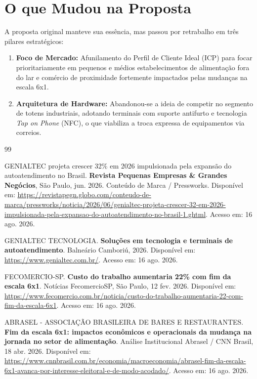 \documentclass[a4paper]{article}
\begin{document}
\section{O que Mudou na Proposta}

A proposta original manteve sua essência, mas passou por retrabalho em três pilares estratégicos:
\begin{enumerate}
    \item \textbf{Foco de Mercado:} Afunilamento do Perfil de Cliente Ideal (ICP) para focar prioritariamente em pequenos e médios estabelecimentos de alimentação fora do lar e comércio de proximidade fortemente impactados pelas mudanças na escala 6x1.
    \item \textbf{Arquitetura de Hardware:} Abandonou-se a ideia de competir no segmento de totens industriais, adotando terminais com suporte antifurto e tecnologia \textit{Tap on Phone} (NFC), o que viabiliza a troca expressa de equipamentos via correios.
\end{enumerate}

\begin{thebibliography}{99}

GENIALTEC projeta crescer 32\% em 2026 impulsionada pela expansão do autoatendimento no Brasil. \textbf{Revista Pequenas Empresas \& Grandes Negócios}, São Paulo, jun. 2026. Conteúdo de Marca / Pressworks. Disponível em: \url{https://revistapegn.globo.com/conteudo-de-marca/pressworks/noticia/2026/06/genialtec-projeta-crescer-32-em-2026-impulsionada-pela-expansao-do-autoatendimento-no-brasil-1.ghtml}. Acesso em: 16 ago. 2026.

GENIALTEC TECNOLOGIA. \textbf{Soluções em tecnologia e terminais de autoatendimento}. Balneário Camboriú, 2026. Disponível em: \url{https://www.genialtec.com.br/}. Acesso em: 16 ago. 2026.

FECOMERCIO-SP. \textbf{Custo do trabalho aumentaria 22\% com fim da escala 6x1}. Notícias FecomercioSP, São Paulo, 12 fev. 2026. Disponível em: \url{https://www.fecomercio.com.br/noticia/custo-do-trabalho-aumentaria-22-com-fim-da-escala-6x1}. Acesso em: 16 ago. 2026.

ABRASEL - ASSOCIAÇÃO BRASILEIRA DE BARES E RESTAURANTES. \textbf{Fim da escala 6x1: impactos econômicos e operacionais da mudança na jornada no setor de alimentação}. Análise Institucional Abrasel / CNN Brasil, 18 abr. 2026. Disponível em: \url{https://www.cnnbrasil.com.br/economia/macroeconomia/abrasel-fim-da-escala-6x1-avanca-por-interesse-eleitoral-e-de-modo-acodado/}. Acesso em: 16 ago. 2026.

\end{thebibliography}
\end{document}
